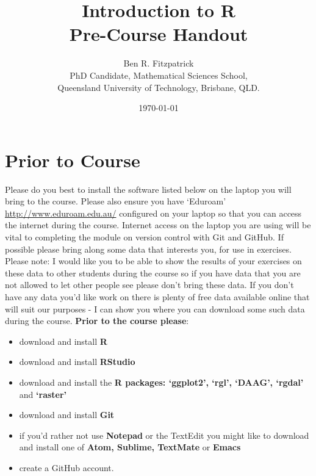 \documentclass{article}[12pt]
\begin{document}
\title{\huge Introduction to R \\
 \large Pre-Course Handout}


\author{Ben R. Fitzpatrick\\ 
\small PhD Candidate, Mathematical Sciences School,\\
\small Queensland University of Technology, Brisbane, QLD.}
\date{\today}
\maketitle

\section*{Prior to Course}
Please do you best to install the software listed below on the laptop you will bring to the course.
Please also ensure you have `Eduroam' \url{http://www.eduroam.edu.au/} configured on your laptop so that you can access the internet during the course.  
Internet access on the laptop you are using will be vital to completing the module on version control with Git and GitHub.
If possible please bring along some data that interests you, for use in exercises.
Please note: I would like you to be able to show the results of your exercises on these data to other students during the course so if you have data that you are not allowed to let other people see please don't bring these data.
If you don't have any data you'd like work on there is plenty of free data available online that will suit our purposes - I can show you where you can download some such data during the course.
\newline
\newline
\textbf{Prior to the course please}: \begin{itemize}
\item download and install \textbf{R}
\item download and install \textbf{RStudio}
\item download and install the \textbf{R packages: `ggplot2', `rgl', `DAAG', `rgdal'} and \textbf{`raster'}
\item download and install \textbf{Git}
\item if you'd rather not use \textbf{Notepad} or the TextEdit you might like to download and install one of \textbf{Atom, Sublime, TextMate} or \textbf{Emacs}
\item create a GitHub account. \end{itemize}
\end{document}
